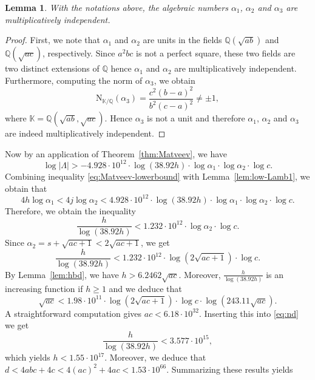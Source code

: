 \documentclass{amsart}
\newtheorem{lemma}{Lemma}
\theoremstyle{definition}
\def\QQ{\mathbb Q}
\begin{document}
\begin{lemma}\label{lem:mult_ind}
  With the notations above, the algebraic numbers $\alpha_1$, $\alpha_2$ and $\alpha_3$ are multiplicatively independent.
\end{lemma}

\begin{proof}
 First, we note that $\alpha_1$ and $\alpha_2$ are units in the fields $\QQ(\sqrt{ab})$ and $\QQ(\sqrt{ac})$, respectively.
 Since $a^2bc$ is not a perfect square, these two fields are two distinct extensions of $\QQ$ hence $\alpha_1$ and $\alpha_2$ are multiplicatively independent.
 Furthermore, computing the norm of $\alpha_3$, we obtain
 $$\mathrm{N}_{\mathbb{K}/\QQ}(\alpha_3)=\frac{c^2(b-a)^2}{b^2(c-a)^2}\neq \pm 1,$$
 where $\mathbb{K}=\QQ(\sqrt{ab},\sqrt{ac})$.
 Hence $\alpha_3$ is not a unit and therefore $\alpha_1$, $\alpha_2$ and $\alpha_3$ are indeed multiplicatively independent.
\end{proof}

Now by an application of Theorem~\ref{thm:Matveev}, we have
   \begin{equation}\label{eq:Matveev-lowerbound}
    \log|\Lambda|> -  4.928\cdot 10^{12}\cdot \log\left(38.92h\right)\cdot  \log\alpha_1 \cdot \log\alpha_2 \cdot \log c.
\end{equation}
Combining inequality \eqref{eq:Matveev-lowerbound} with Lemma~\ref{lem:low-Lamb1}, we obtain that
$$
4h\log\alpha_1<4j\log\alpha_2< 4.928\cdot 10^{12}\cdot \log\left(38.92h\right)\cdot  \log\alpha_1 \cdot \log\alpha_2 \cdot \log c.
$$
Therefore, we obtain the inequality  
$$
\frac{h}{\log(38.92 h)}< 1.232\cdot 10^{12}\cdot \log\alpha_2 \cdot \log c.
$$
Since $\alpha_2=s+\sqrt{ac+1}<2\sqrt{ac+1}$, we get
\begin{equation}\label{eq:nd}
\frac{h}{\log(38.92h)}< 1.232\cdot 10^{12}\cdot \log (2\sqrt{ac+1})\cdot \log c.
\end{equation}
By Lemma~\ref{lem:hbd}, we have $h>6.2462\sqrt{ac}$. Moreover, $\frac{h}{\log(38.92h)}$ is an increasing function if $h\geq 1$ and we deduce that  
\begin{equation}
\sqrt{ac}<1.98\cdot 10^{11}\cdot \log (2\sqrt{ac+1})\cdot \log c\cdot\log (243.11\sqrt{ac}).
\end{equation}
A straightforward computation gives $ac<6.18\cdot 10^{32}$. Inserting this into \eqref{eq:nd} we get
$$\frac{h}{\log(38.92h)}< 3.577\cdot 10^{15},$$
which yields $h<1.55\cdot 10^{17}$. 
Moreover, we deduce that $d<4abc+4c<4(ac)^2+4ac<1.53\cdot 10^{66}$. Summarizing these results yields
\end{document}

